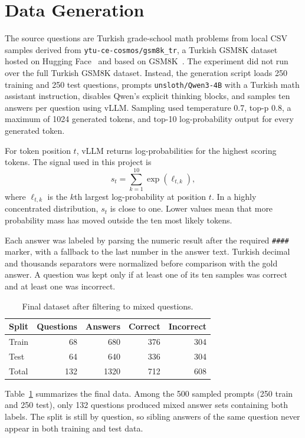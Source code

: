 \documentclass[conference]{IEEEtran}
\begin{document}
\section{Data Generation}
The source questions are Turkish grade-school math problems from local CSV
samples derived from \texttt{ytu-ce-cosmos/gsm8k\_tr}, a Turkish GSM8K dataset
hosted on Hugging Face~\cite{huggingfacegsm8ktr} and based on
GSM8K~\cite{cobbe2021gsm8k}. The experiment did not run over the full Turkish
GSM8K dataset. Instead, the generation script loads 250 training and 250 test
questions, prompts \texttt{unsloth/Qwen3-4B} with a Turkish math assistant
instruction, disables Qwen's explicit thinking blocks, and samples ten answers
per question using vLLM. Sampling used temperature 0.7, top-p 0.8, a maximum of
1024 generated tokens, and top-10 log-probability output for every generated
token.

For token position $t$, vLLM returns log-probabilities for the highest scoring
tokens. The signal used in this project is
\begin{equation}
    s_t = \sum_{k=1}^{10} \exp(\ell_{t,k}),
\end{equation}
where $\ell_{t,k}$ is the $k$th largest log-probability at position $t$. In a
highly concentrated distribution, $s_t$ is close to one. Lower values mean that
more probability mass has moved outside the ten most likely tokens.

Each answer was labeled by parsing the numeric result after the required
\texttt{\#\#\#\#} marker, with a fallback to the last number in the answer text.
Turkish decimal and thousands separators were normalized before comparison with
the gold answer. A question was kept only if at least one of its ten samples was
correct and at least one was incorrect.

\begin{table}[t]
\caption{Final dataset after filtering to mixed questions.}
\label{tab:data}
\centering
\begin{tabular}{lrrrr}
\toprule
Split & Questions & Answers & Correct & Incorrect \\
\midrule
Train & 68 & 680 & 376 & 304 \\
Test & 64 & 640 & 336 & 304 \\
\midrule
Total & 132 & 1320 & 712 & 608 \\
\bottomrule
\end{tabular}
\end{table}

Table~\ref{tab:data} summarizes the final data. Among the 500 sampled prompts
(250 train and 250 test), only 132 questions produced mixed answer sets
containing both labels. The split is still by question, so sibling answers of
the same question never appear in both training and test data.
\end{document}
